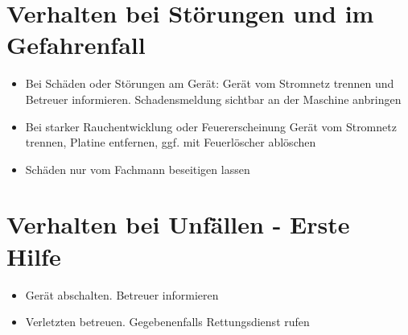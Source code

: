 \documentclass[fontsize=11pt]{scrartcl}
\begin{document}
\section{Verhalten bei Störungen und im Gefahrenfall}

\begin{itemize}
	\item Bei Schäden oder Störungen am Gerät: Gerät vom Stromnetz trennen und Betreuer informieren. Schadensmeldung sichtbar an der Maschine anbringen
	\item Bei starker Rauchentwicklung oder Feuererscheinung Gerät vom Stromnetz trennen, Platine entfernen, ggf. mit Feuerlöscher ablöschen
	\item Schäden nur vom Fachmann beseitigen lassen
\end{itemize}

\section{Verhalten bei Unfällen - Erste Hilfe}

\begin{itemize}
	\item Gerät abschalten. Betreuer informieren
	\item Verletzten betreuen. Gegebenenfalls Rettungsdienst rufen
\end{itemize}
\end{document}
